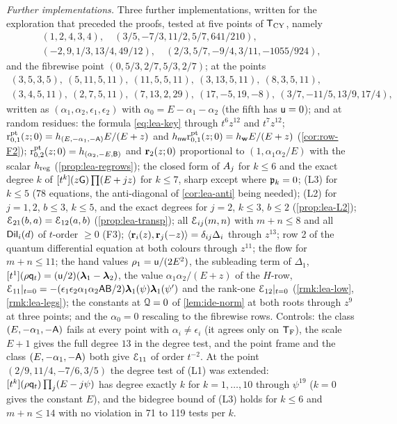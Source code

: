 \emph{Further implementations.} Three further implementations, written for the exploration that preceded the proofs, tested at five points of $\mathsf{T}_{\mathrm{CY}}$, namely
\begin{gather*}
(1,2,4,3,4),\quad(3/5,-7/3,11/2,5/7,641/210),\\
(-2,9,1/3,13/4,49/12),\quad(2/3,5/7,-9/4,3/11,-1055/924),
\end{gather*}
and the fibrewise point $(0,5/3,2/7,5/3,2/7)$; at the points
\begin{gather*}
(3,5,3,5),\ (5,11,5,11),\ (11,5,5,11),\ (3,13,5,11),\ (8,3,5,11),\\
(3,4,5,11),\ (2,7,5,11),\ (7,13,2,29),\ (17,-5,19,-8),\ (3/7,-11/5,13/9,17/4),
\end{gather*}
written as $(\alpha_1,\alpha_2,\epsilon_1,\epsilon_2)$ with $\alpha_0=E-\alpha_1-\alpha_2$ (the fifth has $\mathsf{u}=0$); and at random residues: the formula \eqref{eq:lea-key} through $t^6z^{12}$ and $t^7z^{12}$; $\mathrm{r}^{\mathrm{pt}}_{0,1}(z;0)=h_{(E,-\alpha_1,-\mathsf{A})}E/(E+z)$ and $h_{\mathsf{nw}}\mathrm{r}^{\mathrm{pt}}_{0,1}(z;0)=h_{\mathbf{w}} E/(E+z)$ (\cref{cor:row-F2}); $\mathrm{r}^{\mathrm{pt}}_{0,2}(z;0)=h_{(\alpha_2,-E,\mathsf{B})}$ and $\mathbf{r}_2(z;0)$ proportional to $(1,\alpha_1\alpha_2/E)$ with the scalar $h_{\mathrm{reg}}$ (\cref{prop:lea-regrows}); the closed form of $A_j$ for $k\leq 6$ and the exact degree $k$ of $[t^k](z\mathsf{G})\prod(E+jz)$ for $k\leq 7$, sharp except where $\mathfrak{p}_k=0$; (L3) for $k\leq 5$ (78 equations, the anti-diagonal of \cref{cor:lea-anti} being needed); (L2) for $j=1,2$, $b\leq 3$, $k\leq 5$, and the exact degrees for $j=2$, $k\leq 3$, $b\leq 2$ (\cref{prop:lea-L2}); $\mathcal{E}_{21}(b,a)=\mathcal{E}_{12}(a,b)$ (\cref{prop:lea-transp}); all $\mathcal{E}_{ij}(m,n)$ with $m+n\leq 8$ and all $\mathsf{Dil}_i(d)$ of $t$-order $\geq 0$ (F3); $\langle\mathbf{r}_i(z),\mathbf{r}_j(-z)\rangle=\delta_{ij}\Delta_i$ through $z^{13}$; row 2 of the quantum differential equation at both colours through $z^{11}$; the flow for $m+n\leq 11$; the hand values $\rho_1=\mathsf{u}/(2E^2)$, the subleading term of $\Delta_1$, $[t^1](\rho\mathsf{q}_{t})=(\mathsf{u}/2)(\boldsymbol{\lambda}_1-\boldsymbol{\lambda}_2)$, the value $\alpha_1\alpha_2/(E+z)$ of the $H$-row, $\mathcal{E}_{11}|_{t=0}=-(\epsilon_1\epsilon_2\alpha_1\alpha_2\mathsf{A}\mathsf{B}/2)\boldsymbol{\lambda}_1(\psi)\boldsymbol{\lambda}_1(\psi')$ and the rank-one $\mathcal{E}_{12}|_{t=0}$ (\cref{rmk:lea-low}, \cref{rmk:lea-legs}); the constants at $\mathcal{Q}=0$ of \cref{lem:ide-norm} at both roots through $z^9$ at three points; and the $\alpha_0=0$ rescaling to the fibrewise rows. Controls: the class $(E,-\alpha_1,-\mathsf{A})$ fails at every point with $\alpha_i\neq\epsilon_i$ (it agrees only on $\mathsf{T}_{\mathrm{F}}$), the scale $E+1$ gives the full degree $13$ in the degree test, and the point frame and the class $(E,-\alpha_1,-\mathsf{A})$ both give $\mathcal{E}_{11}$ of order $t^{-2}$. At the point $(2/9,11/4,-7/6,3/5)$ the degree test of (L1) was extended: $[t^k](\rho\mathsf{q}_{t})\prod_j(E-j\psi)$ has degree exactly $k$ for $k=1,\dots,10$ through $\psi^{19}$ ($k=0$ gives the constant $E$), and the bidegree bound of (L3) holds for $k\leq 6$ and $m+n\leq 14$ with no violation in 71 to 119 tests per $k$.

